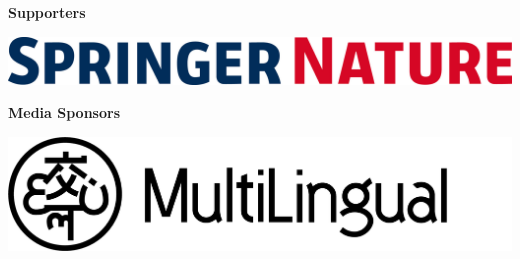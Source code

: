 \documentclass[11pt,oneside]{book}
\begin{document}
  \bigskip
  \bigskip
    \begin{samepage}
  \noindent
  {\Large \textbf{Supporters}}

  \nopagebreak
            \begin{minipage}[c][0.21\linewidth][c]{0.21\linewidth}
        \includegraphics[width=\linewidth]{eamt_volume_1/sponsor_logos/SN_logo_RGB-2.jpg}
      \end{minipage}\hspace{0.05\linewidth}
    
    \end{samepage}

  \bigskip
  \bigskip
    \begin{samepage}
  \noindent
  {\Large \textbf{Media Sponsors}}

  \nopagebreak
            \begin{minipage}[c][0.21\linewidth][c]{0.21\linewidth}
        \includegraphics[width=\linewidth]{eamt_volume_1/sponsor_logos/Logotype_With_Mark.png}
      \end{minipage}\hspace{0.05\linewidth}
    
    \end{samepage}

  \bigskip
  \bigskip
\newpage
{}
\end{document}
